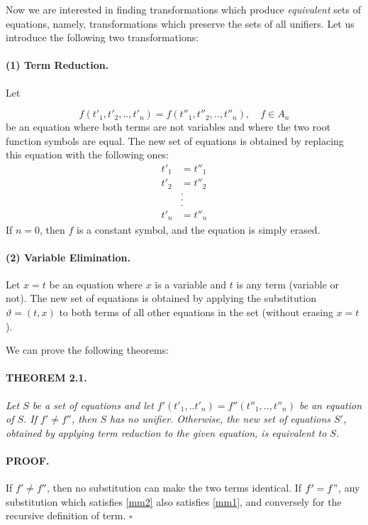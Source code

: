 Now we are interested in finding transformations which produce \emph{equivalent}
sets of equations, namely, transformations which preserve the sets of all
unifiers.
Let us introduce the following two transformations:

\paragraph{(1) Term Reduction.} Let

\begin{equation}\label{mm1}
f(t'_1,t'_2,..,t'_n)=f(t''_1,t''_2,..,t''_n), \quad f \in A_n
\end{equation} 
be an equation where both terms are not variables and where the two root
function symbols are equal. The new set of equations is obtained by replacing
this equation with the following ones: 
\begin{align}\label{mm2}
t'_1 &= t''_1\\
t'_2 &= t''_2\\
&.\\
&.\\
&.\\
t'_n &= t''_n
\end{align}
If $n = 0$, then $f$ is a constant symbol, and the equation is simply erased.

\paragraph{(2) Variable Elimination.} Let $x = t$ be an equation where $x$ is a
variable and $t$ is any term (variable or not). The new set of equations is
obtained by applying the substitution $\vartheta={(t,x)}$ to both terms of all
other equations in the set (without erasing $x = t$).

We can prove the following theorems: 

\paragraph{THEOREM 2.1.} \textit{Let $S$ be a set of equations and let
$f'(t'_1,..t'_n)=f''(t''_1,..,t''_n)$ be an equation of $S$. If $f' \neq f''$,
then $S$ has no unifier. Otherwise, the new set of equations $S'$, obtained by
applying term reduction to the given equation, is equivalent to $S$.}

\paragraph{PROOF.} If $f' \neq f''$, then no substitution can make the
two terms identical.
If $f' = f"$, any substitution which satisfies \ref{mm2} also satisfies
\ref{mm1}, and conversely for the recursive definition of term. $\square$

